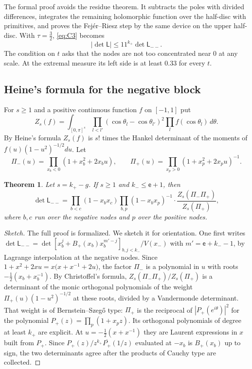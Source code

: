 \documentclass[11pt]{amsart}
\newtheorem{theorem}{Theorem}[section]
\theoremstyle{definition}
\theoremstyle{remark}
\numberwithin{equation}{section}
\begin{document}
The formal proof avoids the residue theorem. It subtracts the poles with divided differences, integrates the
remaining holomorphic function over the half-disc with primitives, and proves the Fej\'er--Riesz step by the
same device on the upper half-disc. With $\tau=\frac32$, \eqref{eq:C3} becomes
\begin{equation}\label{eq:eleven}
 |\det\mathsf L|\le11^{k_+}\det\mathsf L_{--}.
\end{equation}
The condition on $t$ asks that the nodes are not too concentrated near $0$ at any scale. At the extremal
measure its left side is at least $0.33$ for every $t$.

\subsection{Heine's formula for the negative block}\label{ssec:heine}
For $s\ge1$ and a positive continuous function $f$ on $[-1,1]$ put
\[
 Z_s(f)=\int_{[0,\pi]^s}\prod_{l<l'}(\cos\theta_l-\cos\theta_{l'})^2\prod_lf(\cos\theta_l)\,d\theta .
\]
By Heine's formula $Z_s(f)$ is $s!$ times the Hankel determinant of the moments of $f(u)(1-u^2)^{-1/2}du$.
Let
\[
 \Pi_-(u)=\prod_{x_b<0}(1+x_b^2+2x_bu),\qquad \Pi_+(u)=\prod_{x_p>0}(1+x_p^2+2x_pu)^{-1}.
\]

\begin{theorem}\label{thm:heine}
Let $s=k_+-g$. If $s\ge1$ and $k_-\le\mathsf e+1$, then
\[
 \det\mathsf L_{--}=\prod_{b<c}(1-x_bx_c)\prod_{b,p}(1-x_bx_p)^{-1}\cdot\frac{Z_s(\Pi_-\Pi_+)}{Z_s(\Pi_+)},
\]
where $b,c$ run over the negative nodes and $p$ over the positive nodes.
\end{theorem}

\begin{proof}[Sketch]
The full proof is formalized. We sketch it for orientation. One first writes
$\det\mathsf L_{--}=\det[x_b^j+B_+(x_b)x_b^{m'-j}]_{b,j<k_-}/V(x_-)$ with $m'=\mathsf e+k_--1$, by Lagrange
interpolation at the negative nodes. Since $1+x^2+2xu=x\bigl(x+x^{-1}+2u\bigr)$, the factor $\Pi_-$ is a
polynomial in $u$ with roots $-\frac12(x_b+x_b^{-1})$. By Christoffel's formula, $Z_s(\Pi_-\Pi_+)/Z_s(\Pi_+)$
is a determinant of the monic orthogonal polynomials of the weight $\Pi_+(u)(1-u^2)^{-1/2}$ at these roots,
divided by a Vandermonde determinant. That weight is of Bernstein--Szeg\H{o} type: $\Pi_+$ is the reciprocal
of $|P_+(e^{i\theta})|^2$ for the polynomial $P_+(z)=\prod_p(1+x_pz)$. Its orthogonal polynomials of degree at
least $k_+$ are explicit. At $u=-\frac12(x+x^{-1})$ they are Laurent expressions in $x$ built from $P_+$. Since
$P_+(z)/z^{k_+}\overline{P_+}(1/z)$ evaluated at $-x_b$ is $B_+(x_b)$ up to sign, the two determinants agree
after the products of Cauchy type are collected.
\end{proof}
\end{document}

